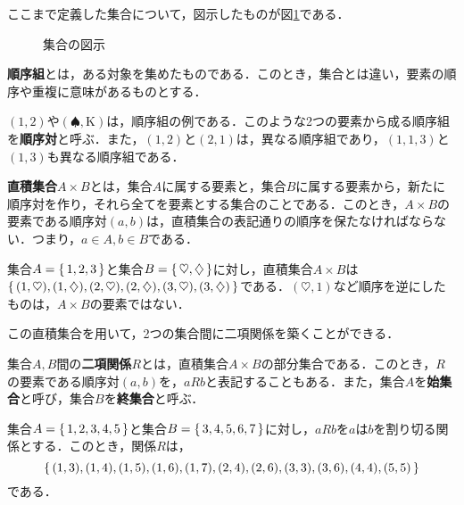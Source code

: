 ここまで定義した集合について，図示したものが図\ref{fig:VennDiagram}である．

\vfill
\begin{figure}[!h]
	\caption{集合の図示}
	\label{fig:VennDiagram}
\end{figure}
\clearpage

\begin{definition}[順序組] %
	\textbf{順序組}とは，ある対象を集めたものである．このとき，集合とは違い，要素の順序や重複に意味があるものとする．
\end{definition}
\begin{example*}
	$(1, 2)$や$(\spadesuit, \text{K})$は，順序組の例である．このような2つの要素から成る順序組を\textbf{順序対}と呼ぶ．また，$(1, 2)$と$(2, 1)$は，異なる順序組であり，$(1, 1, 3)$と$(1, 3)$も異なる順序組である．
\end{example*}
\begin{definition}[直積集合] %
	\textbf{直積集合}$A \times B$とは，集合$A$に属する要素と，集合$B$に属する要素から，新たに順序対を作り，それら全てを要素とする集合のことである．このとき，$A \times B$の要素である順序対$(a, b)$は，直積集合の表記通りの順序を保たなければならない．つまり，$a \in A, b \in B$である．
\end{definition}
\begin{example*}
	集合$A=\left\{\,1,2,3\,\right\}$と集合$B=\left\{\,\heartsuit,\diamondsuit\,\right\}$に対し，直積集合$A \times B$は$\left\{\,(1, \heartsuit),(1,\diamondsuit),(2, \heartsuit),(2,\diamondsuit),(3, \heartsuit),(3,\diamondsuit)\,\right\}$である．$(\heartsuit, 1)$など順序を逆にしたものは，$A \times B$の要素ではない．
\end{example*}

この直積集合を用いて，2つの集合間に二項関係を築くことができる．
\begin{definition}[二項関係] %
	\label{def:binaryRelation}%
	集合$A, B$間の\textbf{二項関係}$R$とは，直積集合$A \times B$の部分集合である．このとき，$R$の要素である順序対$(a,b)$を，$aRb$と表記することもある．また，集合$A$を\textbf{始集合}と呼び，集合$B$を\textbf{終集合}と呼ぶ．
\end{definition}
\begin{example*}
	集合$A=\left\{\,1,2,3,4,5\,\right\}$と集合$B=\left\{\,3,4,5,6,7\,\right\}$に対し，$aRb$を$a$は$b$を割り切る関係とする．このとき，関係$R$は，
	\[
		\left\{\,(1,3),(1,4),(1,5),(1,6),(1,7),(2,4),(2,6),(3,3),(3,6),(4,4),(5,5)\,\right\}
	\]
	である．
\end{example*}

